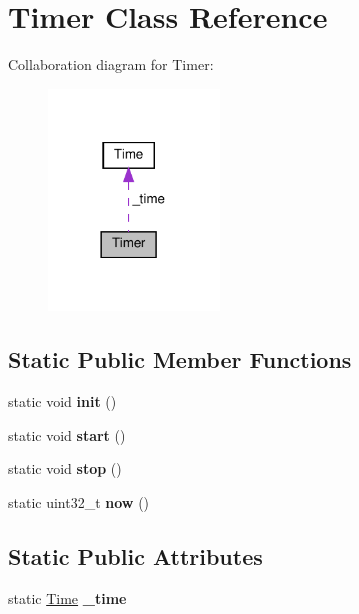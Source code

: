 \hypertarget{classTimer}{}\section{Timer Class Reference}
\label{classTimer}


Collaboration diagram for Timer\+:\nopagebreak
\begin{figure}[H]
\begin{center}
\leavevmode
\includegraphics[width=129pt]{classTimer__coll__graph}
\end{center}
\end{figure}
\subsection*{Static Public Member Functions}
\begin{DoxyCompactItemize}
\item 
\mbox{\label{classTimer_a00eca12a53538b339a927723a246e2d7}} 
static void {\bfseries init} ()
\item 
\mbox{\label{classTimer_a3a8b5272198d029779dc9302a54305a8}} 
static void {\bfseries start} ()
\item 
\mbox{\label{classTimer_a63f0eb44b27402196590a03781515dba}} 
static void {\bfseries stop} ()
\item 
\mbox{\label{classTimer_a8b32de7275bebb6ecc51385f1f1d1d43}} 
static uint32\+\_\+t {\bfseries now} ()
\end{DoxyCompactItemize}
\subsection*{Static Public Attributes}
\begin{DoxyCompactItemize}
\item 
\mbox{\label{classTimer_a831586e44562c0ea423344197dc8e529}} 
static \hyperlink{structTime}{Time} {\bfseries \+\_\+time}
\end{DoxyCompactItemize}
